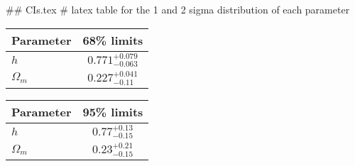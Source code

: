## CIs.tex
# latex table for the 1 and 2 sigma distribution of each parameter

\begin{tabular} { l  c}
 Parameter &  68\% limits\\
\hline
{\boldmath$h              $} & $0.771^{+0.079}_{-0.063}   $\\
{\boldmath$\Omega_m       $} & $0.227^{+0.041}_{-0.11}    $\\
\hline
\end{tabular}

\begin{tabular} { l  c}
 Parameter &  95\% limits\\
\hline
{\boldmath$h              $} & $0.77^{+0.13}_{-0.15}      $\\
{\boldmath$\Omega_m       $} & $0.23^{+0.21}_{-0.15}      $\\
\hline
\end{tabular}
